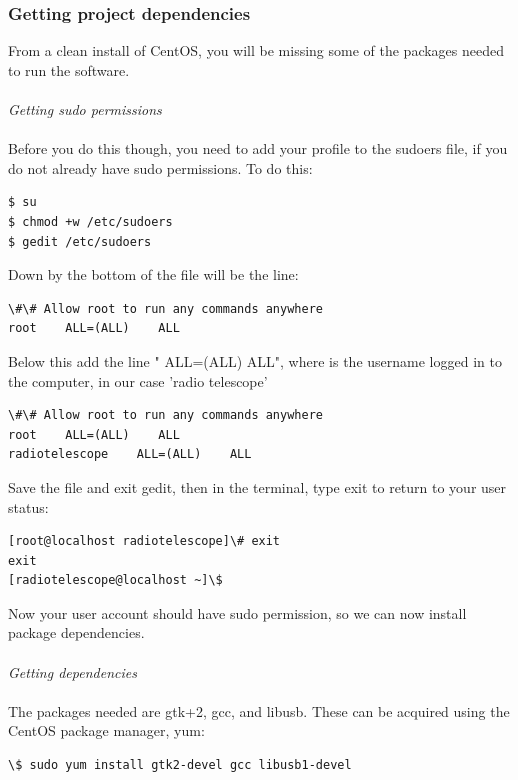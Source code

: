 \documentclass[11pt]{article} %
\begin{document}
\subsubsection{Getting project dependencies}
From a clean install of CentOS, you will be missing some of the packages needed to run the software.
\\ \\
\emph{Getting sudo permissions} \\ \\
Before you do this though, you need to add your profile to the sudoers file, if you do not already have sudo permissions. To do this:

\begin{verbatim}
$ su
$ chmod +w /etc/sudoers
$ gedit /etc/sudoers
\end{verbatim}

Down by the bottom of the file will be the line:

\begin{verbatim}
\#\# Allow root to run any commands anywhere
root    ALL=(ALL)    ALL
\end{verbatim}

Below this add the line " ALL=(ALL) ALL", where is the username logged in to the computer, in our case 'radio telescope'

\begin{verbatim}
\#\# Allow root to run any commands anywhere
root    ALL=(ALL)    ALL
radiotelescope    ALL=(ALL)    ALL
\end{verbatim}

Save the file and exit gedit, then in the terminal, type exit to return to your user status:

\begin{verbatim}
[root@localhost radiotelescope]\# exit
exit
[radiotelescope@localhost ~]\$
\end{verbatim}

Now your user account should have sudo permission, so we can now install package dependencies.
\\ \\
\emph{Getting dependencies}
\\ \\
The packages needed are gtk+2, gcc, and libusb. These can be acquired using the CentOS package manager, yum:

\begin{verbatim}
\$ sudo yum install gtk2-devel gcc libusb1-devel
\end{verbatim}
\end{document}
